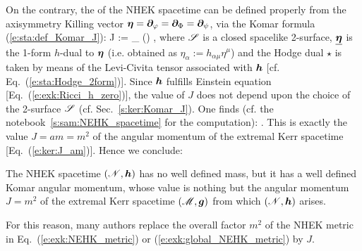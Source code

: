 On the contrary, the
 of the NHEK spacetime can be defined
properly from the axisymmetry Killing vector
$\bm{\eta} = \bm{\partial}_{\varphi} = \bm{\partial}_{\Phi} = \bm{\partial}_{\psi}$, via
the Komar formula (\ref{e:sta:def_Komar_J}):
\be
     J :=  \int_{\Sp} \star(\dd \uu{\eta})  ,
\ee
where $\mathscr{S}$ is a closed spacelike 2-surface, $\underline{\bm{\eta}}$ is the 1-form $h$-dual to $\bm{\eta}$ (i.e. obtained as $\eta_\alpha := h_{\alpha\mu} \eta^\mu$)
and the Hodge dual $\star$
is taken by means of the Levi-Civita tensor associated with $\bm{h}$ [cf. Eq.~(\ref{e:sta:Hodge_2form})].
Since $\bm{h}$ fulfills Einstein equation [Eq.~(\ref{e:exk:Ricci_h_zero})], the value
of $J$ does not depend upon the choice of the 2-surface $\mathscr{S}$ (cf. Sec.~\ref{s:ker:Komar_J}).
One finds (cf. the notebook~\ref{s:sam:NEHK_spacetime} for the computation):
\be
     .
\ee
This is exactly the value $J = a m = m^2$ of the angular momentum of the
extremal Kerr spacetime [Eq.~(\ref{e:ker:J_am})]. Hence we conclude:
\begin{prop}
The NHEK spacetime $(\mathscr{N},\bm{h})$ has no well defined mass, but it has a well defined
Komar angular momentum, whose value is nothing but the angular momentum $J = m^2$
of the extremal Kerr spacetime $(\mathscr{M},\bm{g})$ from which $(\mathscr{N},\bm{h})$ arises.
\end{prop}

\begin{remark}
For this reason, many authors replace the overall factor $m^2$ of the NHEK metric
in Eq.~(\ref{e:exk:NEHK_metric}) or (\ref{e:exk:global_NEHK_metric}) by $J$.
\end{remark}


